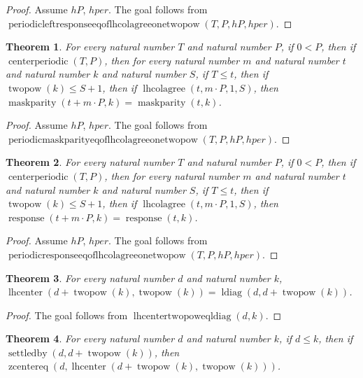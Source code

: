 \documentclass[11pt]{article}
\newtheorem{theorem}{Theorem}[section]
\theoremstyle{definition}
\begin{document}
\begin{proof}
Assume \(hP\), \(hper\).
The goal follows from \(\operatorname{periodicleftresponseeqoflhcolagreeonetwopow}(T, P, hP, hper)\).
\end{proof}
\begin{theorem}
\label{ll:paper:periodic-maskparity-eq-of-lhcolagree-one-twopow}
For every natural number \(T\) and natural number \(P\), if \(0 < P\), then if \(\operatorname{centerperiodic}(T, P)\), then for every natural number \(m\) and natural number \(t\) and natural number \(k\) and natural number \(S\), if \(T \le t\), then if \(\operatorname{twopow}(k) \le S + 1\), then if \(\operatorname{lhcolagree}(t, m \cdot P, 1, S)\), then \(\operatorname{maskparity}(t + m \cdot P, k) = \operatorname{maskparity}(t, k)\).
\end{theorem}
\begin{proof}
Assume \(hP\), \(hper\).
The goal follows from \(\operatorname{periodicmaskparityeqoflhcolagreeonetwopow}(T, P, hP, hper)\).
\end{proof}
\begin{theorem}
\label{ll:paper:periodic-response-eq-of-lhcolagree-one-twopow}
For every natural number \(T\) and natural number \(P\), if \(0 < P\), then if \(\operatorname{centerperiodic}(T, P)\), then for every natural number \(m\) and natural number \(t\) and natural number \(k\) and natural number \(S\), if \(T \le t\), then if \(\operatorname{twopow}(k) \le S + 1\), then if \(\operatorname{lhcolagree}(t, m \cdot P, 1, S)\), then \(\operatorname{response}(t + m \cdot P, k) = \operatorname{response}(t, k)\).
\end{theorem}
\begin{proof}
Assume \(hP\), \(hper\).
The goal follows from \(\operatorname{periodicresponseeqoflhcolagreeonetwopow}(T, P, hP, hper)\).
\end{proof}
\begin{theorem}
\label{ll:paper:lhcenter-twopow-eq-ldiag}
For every natural number \(d\) and natural number \(k\), \(\operatorname{lhcenter}(d + \operatorname{twopow}(k), \operatorname{twopow}(k)) = \operatorname{ldiag}(d, d + \operatorname{twopow}(k))\).
\end{theorem}
\begin{proof}
The goal follows from \(\operatorname{lhcentertwopoweqldiag}(d, k)\).
\end{proof}
\begin{theorem}
\label{ll:paper:lhcenter-twopow-settled-eq-zcenter}
For every natural number \(d\) and natural number \(k\), if \(d \le k\), then if \(\operatorname{settledby}(d, d + \operatorname{twopow}(k))\), then \(\operatorname{zcentereq}(d, \operatorname{lhcenter}(d + \operatorname{twopow}(k), \operatorname{twopow}(k)))\).
\end{theorem}
\end{document}
